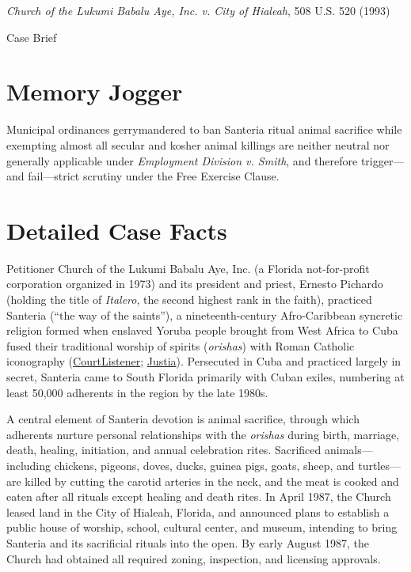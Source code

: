 \documentclass[12pt]{article}
\begin{document}
\begin{center}
{\LARGE \textit{Church of the Lukumi Babalu Aye, Inc. v. City of Hialeah}, 508 U.S. 520 (1993)\par}
\vspace{0.8em}
{\large Case Brief\par}
\end{center}
\vspace{1em}

\section{Memory Jogger}

Municipal ordinances gerrymandered to ban Santeria ritual animal sacrifice while exempting almost all secular and kosher animal killings are neither neutral nor generally applicable under \textit{Employment Division v. Smith}, and therefore trigger---and fail---strict scrutiny under the Free Exercise Clause.

\section{Detailed Case Facts}

Petitioner Church of the Lukumi Babalu Aye, Inc. (a Florida not-for-profit corporation organized in 1973) and its president and priest, Ernesto Pichardo (holding the title of \textit{Italero}, the second highest rank in the faith), practiced Santeria (``the way of the saints''), a nineteenth-century Afro-Caribbean syncretic religion formed when enslaved Yoruba people brought from West Africa to Cuba fused their traditional worship of spirits (\textit{orishas}) with Roman Catholic iconography (\href{https://www.courtlistener.com/opinion/112881/church-of-the-lukumi-babalu-aye-inc-v-city-of-hialeah/}{CourtListener}; \href{https://supreme.justia.com/cases/federal/us/508/520/}{Justia}). Persecuted in Cuba and practiced largely in secret, Santeria came to South Florida primarily with Cuban exiles, numbering at least 50,000 adherents in the region by the late 1980s.

A central element of Santeria devotion is animal sacrifice, through which adherents nurture personal relationships with the \textit{orishas} during birth, marriage, death, healing, initiation, and annual celebration rites. Sacrificed animals---including chickens, pigeons, doves, ducks, guinea pigs, goats, sheep, and turtles---are killed by cutting the carotid arteries in the neck, and the meat is cooked and eaten after all rituals except healing and death rites. In April 1987, the Church leased land in the City of Hialeah, Florida, and announced plans to establish a public house of worship, school, cultural center, and museum, intending to bring Santeria and its sacrificial rituals into the open. By early August 1987, the Church had obtained all required zoning, inspection, and licensing approvals.
\end{document}
